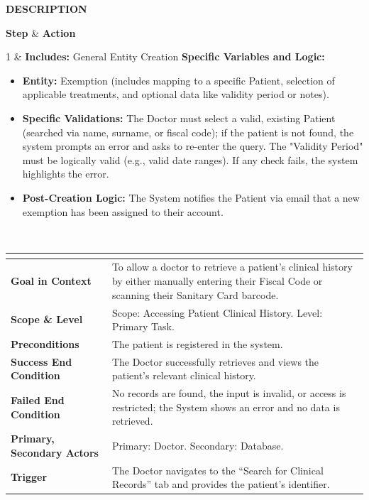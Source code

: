 \documentclass[12pt, a4paper]{article}
\newcommand{\usecaseheader}[9]{
    \vspace{0.5cm}
    \noindent
    \renewcommand{\arraystretch}{1.5}
    \begin{tabularx}{\textwidth}{|>{\columncolor{gray!20}\bfseries}p{4.5cm}|X|}
    \hline
    \rowcolor{blue!10}
    \multicolumn{2}{|c|}{\textbf{USE CASE #1: #2}} \\ \hline
    Goal in Context & #3 \\ \hline
    Scope \& Level & #4 \\ \hline
    Preconditions & #5 \\ \hline
    Success End Condition & #6 \\ \hline
    Failed End Condition & #7 \\ \hline
    Primary, Secondary Actors & #8 \\ \hline
    Trigger & #9 \\ \hline
    \end{tabularx}
    \par\vspace{0.2cm}
}
\newenvironment{ucflow}{
    \noindent\textbf{DESCRIPTION} \par \vspace{0.1cm}
    \noindent
    \renewcommand{\arraystretch}{1.3}
    \tabularx{\textwidth}{|>{\centering\arraybackslash}p{1.2cm}|X|}
    \hline
    \rowcolor{gray!30}
    \textbf{Step} & \textbf{Action} \\ \hline
}{
    \endtabularx
    \par\vspace{0.3cm}
}
\begin{document}
\begin{ucflow}
    1 & \textbf{Includes:} General Entity Creation \newline
        \textbf{Specific Variables and Logic:}
            \begin{itemize}
                \item \textbf{Entity:} Exemption (includes mapping to a specific Patient, selection of applicable treatments, and optional data like validity period or notes).
                \item \textbf{Specific Validations:} The Doctor must select a valid, existing Patient (searched via name, surname, or fiscal code); if the patient is not found, the system prompts an error and asks to re-enter the query. The "Validity Period" must be logically valid (e.g., valid date ranges). If any check fails, the system highlights the error.
                \item \textbf{Post-Creation Logic:} The System notifies the Patient via email that a new exemption has been assigned to their account.
            \end{itemize}\\ \hline
\end{ucflow}
{}
\usecaseheader
  {UC35} %
  {Patient medical record access} %
  {To allow a doctor to retrieve a patient's clinical history by either manually entering their Fiscal Code or scanning their Sanitary Card barcode.} %
  {Scope: Accessing Patient Clinical History. Level: Primary Task.} %
  {The patient is registered in the system.} %
  {The Doctor successfully retrieves and views the patient's relevant clinical history.} %
  {No records are found, the input is invalid, or access is restricted; the System shows an error and no data is retrieved.} %
  {Primary: Doctor. Secondary: Database.} %
  {The Doctor navigates to the ``Search for Clinical Records'' tab and provides the patient's identifier.} %
\end{document}
